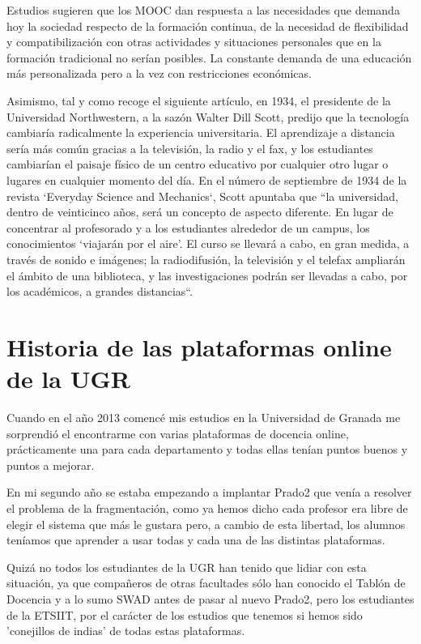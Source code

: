 \bigskip
Estudios sugieren que los MOOC dan respuesta a las necesidades que demanda hoy la sociedad respecto de la formación continua, de la necesidad de flexibilidad y compatibilización con otras actividades y situaciones personales que en la formación tradicional no serían posibles. La constante demanda de una educación más personalizada pero a la vez con restricciones económicas.

\bigskip
Asimismo, tal y como recoge el siguiente artículo\cite{art_12}, en 1934, el presidente de la Universidad Northwestern, a la sazón Walter Dill Scott, predijo que la tecnología cambiaría radicalmente la experiencia universitaria. El aprendizaje a distancia sería más común gracias a la televisión, la radio y el fax, y los estudiantes cambiarían el paisaje físico de un centro educativo por cualquier otro lugar o lugares en cualquier momento del día. En el número de septiembre de 1934 de la revista ‘Everyday Science and Mechanics‘, Scott apuntaba que “la universidad, dentro de veinticinco años, será un concepto de aspecto diferente. En lugar de concentrar al profesorado y a los estudiantes alrededor de un campus, los conocimientos ‘viajarán por el aire’. El curso se llevará a cabo, en gran medida, a través de sonido e imágenes; la radiodifusión, la televisión y el telefax ampliarán el ámbito de una biblioteca, y las investigaciones podrán ser llevadas a cabo, por los académicos, a grandes distancias“.


\section{Historia de las plataformas online de la UGR}

Cuando en el año 2013 comencé mis estudios en la Universidad de Granada me sorprendió el encontrarme con varias plataformas de docencia online, prácticamente una para cada departamento y todas ellas tenían puntos buenos y puntos a mejorar.

\bigskip
En mi segundo año se estaba empezando a implantar Prado2 que venía a resolver el problema de la fragmentación, como ya hemos dicho cada profesor era libre de elegir el sistema que más le gustara pero, a cambio de esta libertad, los alumnos teníamos que aprender a usar todas y cada una de las distintas plataformas.

\bigskip
Quizá no todos los estudiantes de la UGR han tenido que lidiar con esta situación, ya que compañeros de otras facultades sólo han conocido el Tablón de Docencia y a lo sumo SWAD antes de pasar al nuevo Prado2, pero los estudiantes de la ETSIIT, por el carácter de los estudios que tenemos si hemos sido 'conejillos de indias' de todas estas plataformas.

